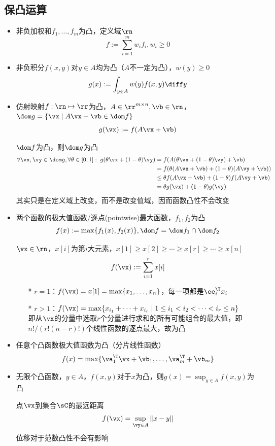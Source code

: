 \subsection{保凸运算}
\begin{itemize}
	\item 非负加权和$f_1,\ldots,f_m$为凸，定义域$\rn$
	\[f:=\sum_{i=1}^m w_if_i,w_i\geq 0\]
	\item 非负积分$f(x,y)$对$y\in A$均为凸（$A$不一定为凸），$w(y)\geq 0$
	\[g(x):=\int_{y\in A}w(y)f(x,y)\diff y\]
	\item 仿射映射$f:\rn\mapsto\rr$为凸，$A\in\rr^{m\times n},\vb\in\rn$，$\dom g=\{\vx\mid A\vx+\vb\in\dom f\}$
	\[g(\vx):=f(A\vx+\vb)\]
	\begin{analysis}
		$\dom f$为凸，则$\dom g$为凸
		\[\begin{aligned}
			\forall \vx,\vy\in\dom g,\forall\theta\in[0,1]:\;
		g(\theta \vx+(1-\theta)\vy)&=f(A(\theta \vx+(1-\theta)\vy)+\vb)\\
		&=f(\theta(A\vx+\vb)+(1-\theta)(A\vy+\vb))\\
		&\leq\theta f(A\vx+\vb)+(1-\theta)f(A\vy+\vb)\\
		&=\theta g(\vx)+(1-\theta)g(\vy)
		\end{aligned}\]
		其实只是在定义域上改变，而不是改变值域，因而函数凸性不会改变
	\end{analysis}

	\item 两个函数的极大值函数/逐点(pointwise)最大函数，$f_1,f_2$为凸
	\[f(x):=\max\{f_1(x),f_2(x)\},\dom f=\dom f_1\cap\dom f_2\]
	\begin{example}
	$\vx\in\rn$，$x[i]$为第$i$大元素，$x[1]\geq x[2]\geq\cdots\geq x[r]\geq\cdots\geq x[n]$
	\[f(\vx):=\sum_{i=1}^r x[i]\]
	\begin{itemize}
	\item[*] $r=1$：$f(\vx)=x[1]=\max\{x_1,\ldots,x_n\}$，每一项都是$\ee_i^\T x_i$
	\item[*] $r>1$：$f(\vx)=\max\{x_{i_1}+\cdots+x_{i_r}\mid 1\leq i_1<i_2<\cdots<i_r\leq n\}$\\
	即从$\vx$的分量中选取$r$个分量进行求和的所有可能组合的最大值，即$n!/(r!(n-r)!)$个线性函数的逐点最大，故为凸
	\end{itemize}
	\end{example}
	\item 任意个凸函数极大值函数为凸（分片线性函数）
	\[f(x)=\max\{\va_1^\T \vx+\vb_1,\ldots,\va_m^\T+\vb_m\}\]
	\item 无限个凸函数，$y\in A$，$f(x,y)$对于$x$为凸，则$g(x)=\sup_{y\in A} f(x,y)$为凸
	\begin{example}
	点$\vx$到集合$\sC$的最远距离
	\[f(\vx)=\sup_{\vy\in A}\|x-y\|\]
	位移对于范数凸性不会有影响
	\end{example}


\end{itemize}
